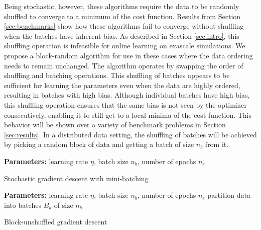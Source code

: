 \documentclass[review]{elsarticle}
\begin{document}
Being stochastic, however, these algorithms require the data to be randomly
shuffled to converge to a minimum of the cost function. Results from
Section \ref{sec:benchmarks} show how these algorithms fail to converge without
shuffling when the batches have inherent bias.  As described in Section
\ref{sec:intro}, this shuffling operation is infeasible for online learning on
exascale simulations. We propose a block-random algorithm for use in these
cases where the data ordering needs to remain unchanged. The algorithm operates
by swapping the order of shuffling and batching operations. This shuffling of
batches appears to be sufficient for learning the parameters even when the data
are highly ordered, resulting in batches with high bias. Although individual
batches have high bias, this shuffling operation ensures that the same bias is
not seen by the optimizer consecutively, enabling it to still get to a local
minima of the cost function. This behavior will be shown over a variety of
benchmark problems in Section \ref{sec:results}. In a distributed data setting,
the shuffling of batches will be achieved by picking a random block of data and
getting a batch of size $n_b$ from it.

\begin{algorithm}[h]
\DontPrintSemicolon
    \textbf{Parameters:} learning rate $\eta$, batch size $n_b$, number of epochs $n_e$\;
    \SetAlgoLined
    \caption{Stochastic gradient descent with mini-batching}\label{algo:mini-batch}
\end{algorithm}

\begin{algorithm}[H]
    \DontPrintSemicolon
    \textbf{Parameters:} learning rate $\eta$, batch size $n_b$, number of epochs $n_e$\;
    \SetAlgoLined
    partition data into batches $B_k$ of size $n_b$\;
    \caption{Block-unshuffled gradient descent}\label{algo:block-unshuffled}
\end{algorithm}
\end{document}
